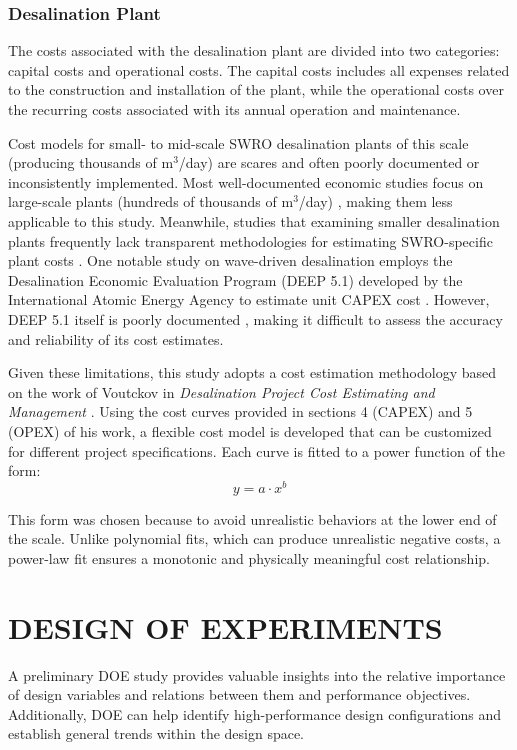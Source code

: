 \documentclass[twocolumn,10pt]{asme2e}
\begin{document}
\subsubsection{Desalination Plant}
The costs associated with the desalination plant are divided into two categories: capital costs and operational costs. The capital costs includes all expenses related to the construction and installation of the plant, while the operational costs over the recurring costs associated with its annual operation and maintenance.

Cost models for small- to mid-scale SWRO desalination plants of this scale (producing thousands of m$^3$/day) are scares and often poorly documented or inconsistently implemented. Most well-documented economic studies focus on large-scale plants (hundreds of thousands of m$^3$/day) \cite{Slocum2016,Haefner2023,roopexcurve,Wittholz2008}, making them less applicable to this study. Meanwhile, studies that examining smaller desalination plants frequently lack transparent methodologies for estimating SWRO-specific plant costs \cite{Elkadeem2024,Goekcek2016}. One notable study on wave-driven desalination employs the Desalination Economic Evaluation Program (DEEP 5.1) developed by the International Atomic Energy Agency to estimate unit CAPEX cost \cite{Yu2022}. However, DEEP 5.1 itself is poorly documented \cite{DEEP5manual}, making it difficult to assess the accuracy and reliability of its cost estimates. 

Given these limitations, this study adopts a cost estimation methodology based on the work of Voutckov in \emph{Desalination Project Cost Estimating and Management} \cite{voutch}. Using the cost curves provided in sections 4 (CAPEX) and 5 (OPEX) of his work, a flexible cost model is developed that can be customized for different project specifications. Each curve is fitted to a power function of the form:
\begin{equation}
    y = a \cdot x^b
\end{equation}

This form was chosen because to avoid unrealistic behaviors at the lower end of the scale. Unlike polynomial fits, which can produce unrealistic negative costs, a power-law fit ensures a monotonic and physically meaningful cost relationship.

\section{DESIGN OF EXPERIMENTS}
A preliminary DOE study provides valuable insights into the relative importance of design variables and relations between them and performance objectives. Additionally, DOE can help identify high-performance design configurations and establish general trends within the design space. 
\end{document}
